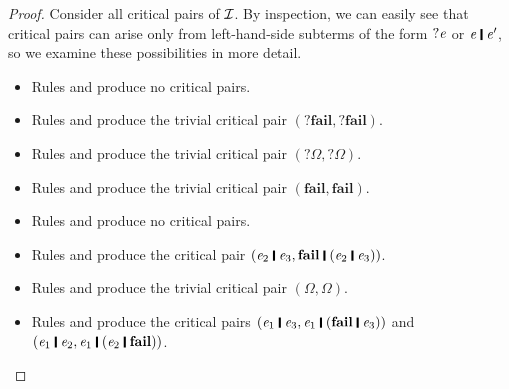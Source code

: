 \begin{proof}
Consider all critical pairs of $\mathcal{I}$. By inspection, we can easily see that critical pairs can arise only from left-hand-side subterms of the form \ensuremath{\mathbin{?}\Varid{e}} or \ensuremath{\Varid{e}\;\rule[-0.1em]{0.15em}{0.75em}\;\Varid{e'}}, so we examine these possibilities in more detail.
\begin{itemize}
\item  Rules  and  produce no critical pairs.

\item  Rules  and  produce the trivial critical pair \ensuremath{(\mathbin{?}\textbf{fail},\mathbin{?}\textbf{fail})}. 

\item  Rules  and  produce the trivial critical pair \ensuremath{(\mathbin{?}\mathit{\Omega},\mathbin{?}\mathit{\Omega})}. 

\item  Rules  and  produce the trivial critical pair \ensuremath{(\textbf{fail},\textbf{fail})}. 

\item  Rules  and  produce no critical pairs.

\item  Rules  and  produce the critical pair \ensuremath{(\Varid{e}_{\mathrm{2}}\;\rule[-0.1em]{0.15em}{0.75em}\;\Varid{e}_{\mathrm{3}},\textbf{fail}\;\rule[-0.1em]{0.15em}{0.75em}\;(\Varid{e}_{\mathrm{2}}\;\rule[-0.1em]{0.15em}{0.75em}\;\Varid{e}_{\mathrm{3}}))}.

\item  Rules  and  produce the trivial critical pair \ensuremath{(\mathit{\Omega},\mathit{\Omega})}.

\item  Rules  and  produce the critical pairs \ensuremath{(\Varid{e}_{\mathrm{1}}\;\rule[-0.1em]{0.15em}{0.75em}\;\Varid{e}_{\mathrm{3}},\Varid{e}_{\mathrm{1}}\;\rule[-0.1em]{0.15em}{0.75em}\;(\textbf{fail}\;\rule[-0.1em]{0.15em}{0.75em}\;\Varid{e}_{\mathrm{3}}))} and \ensuremath{(\Varid{e}_{\mathrm{1}}\;\rule[-0.1em]{0.15em}{0.75em}\;\Varid{e}_{\mathrm{2}},\Varid{e}_{\mathrm{1}}\;\rule[-0.1em]{0.15em}{0.75em}\;(\Varid{e}_{\mathrm{2}}\;\rule[-0.1em]{0.15em}{0.75em}\;\textbf{fail}))}.


\end{itemize}
\end{proof}
